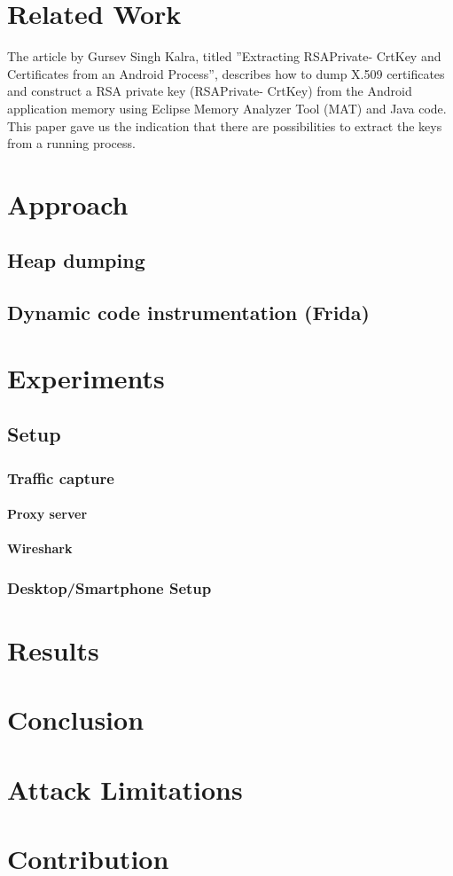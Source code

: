 \documentclass[12pt, a4paper]{report}
\begin{document}
\chapter{Related Work}
The article by Gursev Singh Kalra, titled ”Extracting RSAPrivate-
CrtKey and Certificates from an Android Process”, describes how to
dump X.509 certificates and construct a RSA private key (RSAPrivate-
CrtKey) from the Android application memory using Eclipse Memory
Analyzer Tool (MAT) and Java code. This paper gave us the indication that there are possibilities to extract the keys from a running
process.\cite{ref1}

\chapter{Approach}
\section{Heap dumping}
\section{Dynamic code instrumentation (Frida)}

\chapter{Experiments}
\section{Setup}
\subsection{Traffic capture}
\subsubsection{Proxy server}
\subsubsection{Wireshark}
\subsection{Desktop/Smartphone Setup}

\chapter{Results}

\chapter{Conclusion}

\chapter{Attack Limitations}

\chapter{Contribution} 



\end{document}

